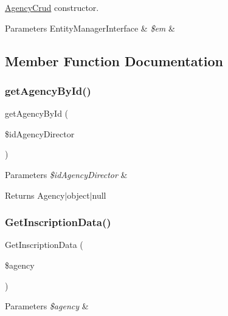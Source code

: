\mbox{\hyperlink{class_app_1_1_d_a_l_1_1_agency_crud}{Agency\+Crud}} constructor. 
\begin{DoxyParams}[1]{Parameters}
Entity\+Manager\+Interface & {\em \$em} & \\
\hline
\end{DoxyParams}


\subsection{Member Function Documentation}
\mbox{\label{class_app_1_1_d_a_l_1_1_agency_crud_a54229573070f2b5cf281e41d8df7a469}} 
\subsubsection{\texorpdfstring{getAgencyById()}{getAgencyById()}}
{\footnotesize\ttfamily get\+Agency\+By\+Id (\begin{DoxyParamCaption}\item[{}]{\$id\+Agency\+Director }\end{DoxyParamCaption})}


\begin{DoxyParams}{Parameters}
{\em \$id\+Agency\+Director} & \\
\hline
\end{DoxyParams}
\begin{DoxyReturn}{Returns}
Agency$\vert$object$\vert$null 
\end{DoxyReturn}
\mbox{\label{class_app_1_1_d_a_l_1_1_agency_crud_a6be585abbc3ecd13be7ce55b17684201}} 
\subsubsection{\texorpdfstring{GetInscriptionData()}{GetInscriptionData()}}
{\footnotesize\ttfamily Get\+Inscription\+Data (\begin{DoxyParamCaption}\item[{}]{\$agency }\end{DoxyParamCaption})}


\begin{DoxyParams}{Parameters}
{\em \$agency} & \\
\hline
\end{DoxyParams}
\mbox{\label{class_app_1_1_d_a_l_1_1_agency_crud_aaed7f556480a380f61b2a61cac7c83e9}} 

